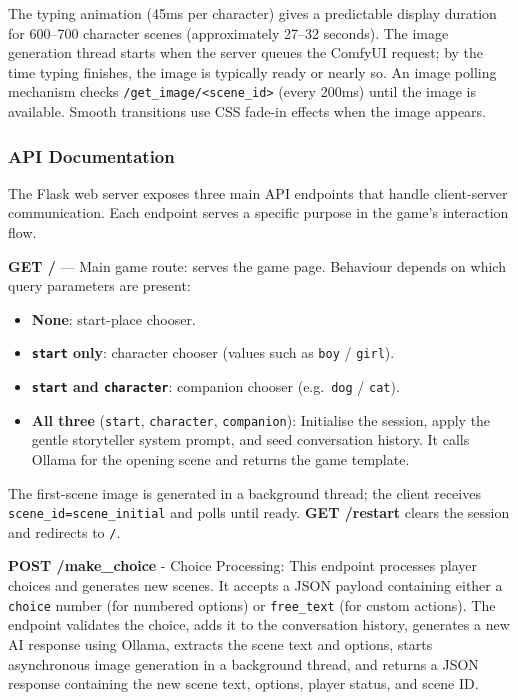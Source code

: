 \documentclass[12pt,a4paper]{article}
\newcommand{\breakablegetimage}[1]{\texttt{/get\_image/}\allowbreak\texttt{#1}}
\begin{document}
The typing animation (45ms per character) gives a predictable display duration for 600--700 character scenes (approximately 27--32 seconds). The image generation thread starts when the server queues the ComfyUI request; by the time typing finishes, the image is typically ready or nearly so. An image polling mechanism checks \breakablegetimage{<scene\_id>} (every 200ms) until the image is available. Smooth transitions use CSS fade-in effects when the image appears.

    \subsubsection{API Documentation}

    The Flask web server exposes three main API endpoints that handle client-server communication. Each endpoint serves a specific purpose in the game's interaction flow.

\textbf{GET /} --- Main game route: serves the game page. Behaviour depends on which query parameters are present:
\begin{itemize}[leftmargin=1.5em,itemsep=2pt,topsep=4pt,parsep=0pt]
    \item \textbf{None}: start-place chooser.
    \item \textbf{\texttt{start} only}: character chooser (values such as \texttt{boy} / \texttt{girl}).
    \item \textbf{\texttt{start} and \texttt{character}}: companion chooser (e.g.\ \texttt{dog} / \texttt{cat}).
    \item \textbf{All three} (\texttt{start}, \texttt{character}, \texttt{companion}):\newline
    Initialise the session, apply the gentle storyteller system prompt, and seed conversation history.
    It calls Ollama for the opening scene and returns the game template.
\end{itemize}
The first-scene image is generated in a background thread; the client receives \texttt{scene\_id=}\allowbreak\texttt{scene\_initial} and polls until ready. \textbf{GET /restart} clears the session and redirects to \texttt{/}.

    \textbf{POST /make\_choice} - Choice Processing: This endpoint processes player choices and generates new scenes. It accepts a JSON payload containing either a \texttt{choice} number (for numbered options) or \texttt{free\_text} (for custom actions).     The endpoint validates the choice, adds it to the conversation history, generates a new AI response using Ollama, extracts the scene text and options, starts asynchronous image generation in a background thread, and returns a JSON response containing the new scene text, options, player status, and scene ID.
\end{document}

